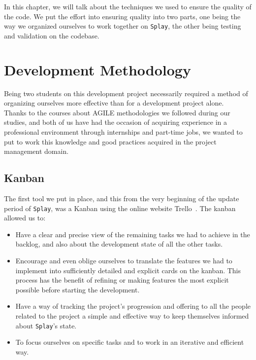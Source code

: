 \documentclass{eplmastersthesis}
\begin{document}
    In this chapter, we will talk about the techniques we used to ensure the
    quality of the code. We put the effort into ensuring quality into two
    parts, one being the way we organized ourselves to work together on \texttt{Splay},
    the other being testing and validation on the codebase.

    \section{Development Methodology}

      Being two students on this development project necessarily required a
      method of organizing ourselves more effective than for a development
      project alone.\\

      Thanks to the courses about AGILE methodologies we followed during our
      studies, and both of us have had the occasion of acquiring
      experience in a professional environment through internships and part-time jobs,
      we wanted to put to work this knowledge and good practices acquired in
      the project management domain.

        \subsection{Kanban}

          The first tool we put in place, and this from the very beginning of
          the update period of \texttt{Splay}, was a Kanban using the online website
          Trello~\cite{trello}. The kanban allowed us to: \\

          \begin{itemize}
            \item Have a clear and precise view of the remaining tasks we had
            to achieve in the backlog, and also about the development state of
            all the other tasks.
            \item Encourage and even oblige ourselves to translate the features
            we had to implement into sufficiently detailed and explicit cards on
            the kanban. This process has the benefit of refining or making
            features the most explicit possible before starting the development.
            \item Have a way of tracking the project's progression and offering
            to all the people related to the project a simple and effective way
            to keep themselves informed about \texttt{Splay}'s state.
            \item To focus ourselves on specific tasks and to work in an
            iterative and efficient way.
          \end{itemize}
\end{document}
